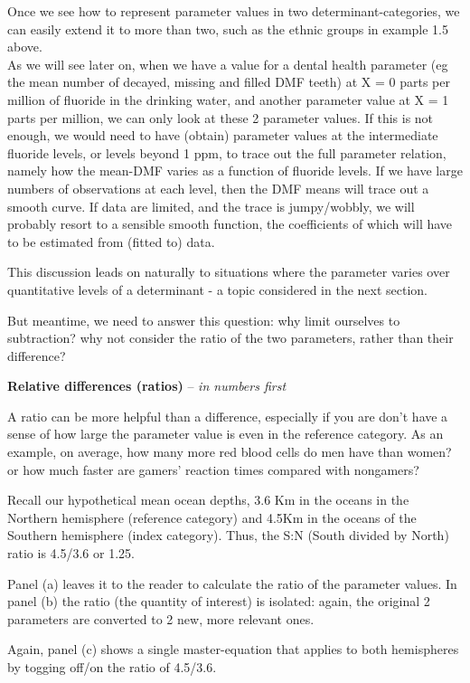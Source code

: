 \documentclass[]{book}
\begin{document}
Once we see how to represent parameter values in two determinant-categories, we can easily extend it to more than two, such as the ethnic groups in example 1.5 above.\\
As we will see later on, when we have a value for a dental health parameter (eg the mean number of decayed, missing and filled DMF teeth) at X = 0 parts per million of fluoride in the drinking water, and another parameter value at X = 1 parts per million, we can only look at these 2 parameter values. If this is not enough, we would need to have (obtain) parameter values at the intermediate fluoride levels, or levels beyond 1 ppm, to trace out the full parameter relation, namely how the mean-DMF varies as a function of fluoride levels. If we have large numbers of observations at each level, then the DMF means will trace out a smooth curve. If data are limited, and the trace is jumpy/wobbly, we will probably resort to a sensible smooth function, the coefficients of which will have to be estimated from (fitted to) data.

This discussion leads on naturally to situations where the parameter varies over quantitative levels of a determinant - a topic considered in the next section.

But meantime, we need to answer this question: why limit ourselves to subtraction? why not consider the ratio of the two parameters, rather than their difference?

\textbf{Relative differences (ratios)} -- \emph{in numbers first}

A ratio can be more helpful than a difference, especially if you are don't have a sense of how large the parameter value is even in the reference category. As an example, on average, how many more red blood cells do men have than women? or how much faster are gamers' reaction times compared with nongamers?

Recall our hypothetical mean ocean depths, 3.6 Km in the
oceans in the Northern hemisphere (reference category) and 4.5Km in the oceans of the Southern hemisphere (index category). Thus, the S:N (South divided by North) ratio is 4.5/3.6 or 1.25.

Panel (a) leaves it to the reader to calculate the ratio of the parameter values. In panel (b) the ratio (the quantity of interest) is isolated: again, the original 2 parameters are converted to 2 new, more relevant ones.

Again, panel (c) shows a single master-equation that applies to both hemispheres by togging off/on the ratio of 4.5/3.6.
\end{document}
